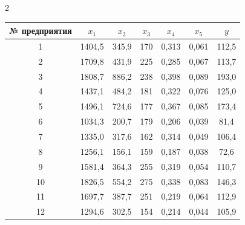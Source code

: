 \begin{multicols}{2}
\setcounter{table}{4}


\begin{table}\small %


\begin{center}




\label{TabData}


\vspace*{2ex}





\begin{tabular}{|c|c|c|c|c|c||c|} 


\hline


№ предприятия & $x_1$ & $x_2$ & $x_3$ & $x_4$ & $x_5$ & $y$ \\


\hline 


\hphantom{9}1 & 1404,5 &345,9& 170 &0,313 & 0,061 & 112,5 \\


\hphantom{9}2 & 1709,8 &431,9& 225 &0,285 & 0,067 & 113,7 \\


\hphantom{9}3 & 1808,7 &886,2& 238 &0,398 & 0,089 & 193,0 \\


\hphantom{9}4 & 1437,1 &484,2& 181 &0,322 & 0,076 & 125,0 \\


\hphantom{9}5 & 1496,1 &724,6& 177 &0,367 & 0,085 & 173,4 \\


\hphantom{9}6 & 1034,3 &200,7& 179 &0,206 & 0,039 & \hphantom{1}81,4 \\


\hphantom{9}7 & 1335,0 &317,6& 162 &0,314 & 0,049 & 106,4 \\


\hphantom{9}8 & 1256,1 &156,1& 159 &0,187 & 0,038 & \hphantom{1}72,6 \\


\hphantom{9}9 & 1581,4 &364,3& 255 &0,319 & 0,054 & 110,7 \\


10& 1826,5 &554,2& 275 &0,338 & 0,083 & 146,3 \\


11& 1697,7 &387,7& 251 &0,219 & 0,064 & 112,9 \\


12& 1294,6 &302,5& 154 &0,214 & 0,044 & 105,9 \\



\end{tabular}
\end{center}
\end{table}
\end{multicols}
